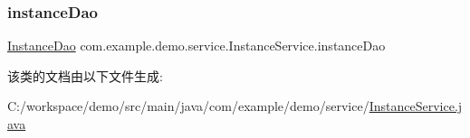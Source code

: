 \subsubsection{\texorpdfstring{instance\+Dao}{instanceDao}}
{\footnotesize\ttfamily \mbox{\hyperlink{interfacecom_1_1example_1_1demo_1_1dao_1_1_instance_dao}{Instance\+Dao}} com.\+example.\+demo.\+service.\+Instance\+Service.\+instance\+Dao\hspace{0.3cm}{\ttfamily [package]}}



该类的文档由以下文件生成\+:\begin{DoxyCompactItemize}
\item 
C\+:/workspace/demo/src/main/java/com/example/demo/service/\mbox{\hyperlink{_instance_service_8java}{Instance\+Service.\+java}}\end{DoxyCompactItemize}
